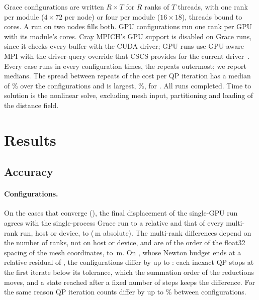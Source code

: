 \documentclass[sigconf,nonacm]{acmart}
\begin{document}
Grace configurations are written $R\times T$ for $R$ ranks of $T$ threads, with one rank per
module ($4\times72$ per node) or four per module ($16\times18$), threads bound to cores. A run on
two nodes fills both. GPU
configurations run one rank per GPU with its module's \machineCores{} cores. Cray MPICH's GPU
support is disabled on Grace runs, since it checks every buffer with the CUDA driver; GPU runs
use GPU-aware MPI with the driver-query override that CSCS provides for the current
driver~\cite{cscsmpich}. Every case runs in every configuration \benchRepeats{} times, the
repeats outermost; we report medians. The spread between repeats of the cost per QP iteration
has a median of \benchSpreadMedian\% over the configurations and is largest, \benchSpread\%, for
\benchSpreadWhere{}. All \benchRuns{} runs completed. Time to solution is the nonlinear
solve, excluding mesh input, partitioning and loading of the distance field.

\begin{table}
\caption{Cases. Degrees of freedom of the valve blocks; contact nodes are the skin nodes within
the cutoff of the obstacle at the start.}
\label{tab:cases}
\small

\end{table}

\section{Results}

\subsection{Accuracy}

\paragraph{Configurations.} On the cases that converge (\convergedCases{}), the final displacement
of the single-GPU run agrees with the single-process Grace run to a relative \agreeSerial{} and
that of every multi-rank run, host or device, to \agreeParallel{} (\agreeParallelAbs{}\,\si{\metre}
absolute). The multi-rank differences depend on the number of ranks, not on host or device, and
are of the order of the float32 spacing of the mesh coordinates, \coordUlp{} to
\coordUlpMax{}\,\si{\metre}. On \unconvergedCases{}, whose Newton budget ends at a relative
residual of \finalUnconverged{}, the configurations differ by up to \agreeUnconverged{}: each
inexact QP stops at the first iterate below its tolerance, which the summation order of the
reductions moves, and a state reached after a fixed number of steps keeps the difference. For the
same reason QP iteration counts differ by up to \qpSpreadMax\% between configurations.
\end{document}
